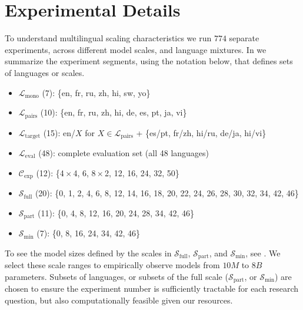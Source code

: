 \section{Experimental Details}
\label{app:experimental-details}

To understand multilingual scaling characteristics we run $774$ separate experiments, across different model scales, and language mixtures.
In  we summarize the experiment segments, using the notation below, that defines sets of languages or scales.

\begin{itemize}
  \item $\mathcal{L}_{\text{mono}}$ (7): \{en, fr, ru, zh, hi, sw, yo\}
  \item $\mathcal{L}_{\text{pairs}}$ (10): \{en, fr, ru, zh, hi, de, es, pt, ja, vi\}
  \item $\mathcal{L}_{\text{target}}$ (15): en/$X$ for $X\in\mathcal{L}_{\text{pairs}}$ + \{es/pt, fr/zh, hi/ru, de/ja, hi/vi\}
  \item $\mathcal{L}_{\text{eval}}$ (48): complete evaluation set (all 48 languages)

  \item $\mathcal{C}_{\text{exp}}$ (12): \{4\,$\times$\,4, 6, 8\,$\times$\,2, 12, 16, 24, 32, 50\}
  
  \item $\mathcal{S}_{\text{full}}$ (20): \{0, 1, 2, 4, 6, 8, 12, 14, 16, 18, 20, 22, 24, 26, 28, 30, 32, 34, 42, 46\}
  \item $\mathcal{S}_{\text{part}}$ (11): \{0, 4, 8, 12, 16, 20, 24, 28, 34, 42, 46\}
  \item $\mathcal{S}_{\text{min}}$ (7):  \{0, 8, 16, 24, 34, 42, 46\}
\end{itemize}

To see the model sizes defined by the scales in $\mathcal{S}_{\text{full}}$, $\mathcal{S}_{\text{part}}$, and $\mathcal{S}_{\text{min}}$, see .
We select these scale ranges to empirically observe models from $10M$ to $8B$ parameters.
Subsets of languages, or subsets of the full scale ($\mathcal{S}_{\text{part}}$, or $\mathcal{S}_{\text{min}}$) are chosen to ensure the experiment number is sufficiently tractable for each research question, but also computationally feasible given our resources.

